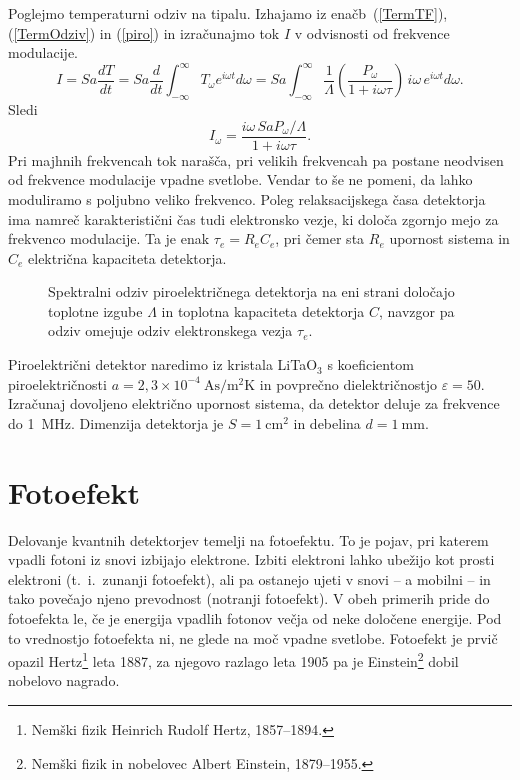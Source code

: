 Poglejmo temperaturni odziv na tipalu. Izhajamo iz enačb~(\ref{TermTF}), (\ref{TermOdziv}) in
(\ref{piro}) in izračunajmo tok $I$ v odvisnosti od frekvence modulacije.
\begin{equation}
I = Sa \frac{dT}{dt} = Sa \frac{d}{dt} \int_{-\infty}^{\infty} T_\omega e^{i\omega t}d\omega 
=Sa\int_{-\infty}^{\infty}\frac{1}{\Lambda}\left(\frac{P_\omega}{1+i \omega \tau}\right) \,i \omega\,
e^{i\omega t}d\omega.
\end{equation}
Sledi 
\begin{equation}
I_\omega = \frac{i \omega\, SaP_\omega/\Lambda}{1 + i \omega \tau}.
\end{equation}
Pri majhnih frekvencah tok narašča, pri velikih frekvencah pa postane neodvisen od
frekvence modulacije vpadne svetlobe. Vendar to še ne pomeni, da lahko moduliramo s poljubno 
veliko frekvenco. Poleg relaksacijskega časa detektorja ima namreč karakteristični čas tudi
elektronsko vezje, ki določa zgornjo mejo za frekvenco modulacije. 
Ta je enak $\tau_e = R_eC_e$, pri čemer
sta $R_e$ upornost sistema in $C_e$ električna kapaciteta detektorja. 
\begin{figure}[h]
\centering
\def\svgwidth{90truemm} 

\caption{Spektralni odziv piroelektričnega detektorja na eni strani določajo toplotne izgube 
$\Lambda$ in toplotna kapaciteta detektorja $C$, navzgor pa odziv omejuje odziv elektronskega vezja $\tau_e$.}
\label{fig:Piro}
\end{figure}

\begin{definition}
Piroelektrični detektor naredimo iz kristala LiTaO$_3$ 
s koeficientom piroelektričnosti
$a = 2,3 \times 10^{-4}~\si{\ampere \second /\metre^2 \kelvin}$ in povprečno 
dielektričnostjo $\varepsilon = 50$. Izračunaj dovoljeno električno upornost sistema, 
da detektor deluje za frekvence do 1~MHz. 
Dimenzija detektorja je $S = 1~\si{\centi\metre^2}$ in debelina $d = 1~\si{\milli\metre}$.
\end{definition}

\section{Fotoefekt}
Delovanje kvantnih detektorjev temelji na fotoefektu. 
To je pojav, pri katerem vpadli
fotoni iz snovi izbijajo elektrone. Izbiti elektroni lahko ubežijo kot prosti elektroni
(t.\ i.\ zunanji fotoefekt),
ali pa ostanejo ujeti v snovi -- a mobilni -- in tako povečajo 
njeno prevodnost (notranji fotoefekt). 
V obeh primerih pride do fotoefekta le, 
če je energija vpadlih fotonov večja od neke določene energije.
Pod to vrednostjo fotoefekta ni, ne glede na moč vpadne svetlobe.
Fotoefekt je prvič opazil Hertz\footnote{Nemški fizik Heinrich Rudolf Hertz, 1857--1894.} 
leta 1887, za njegovo razlago leta
1905 pa je Einstein\footnote{Nemški fizik in nobelovec Albert Einstein, 1879--1955.} 
dobil nobelovo nagrado. 

